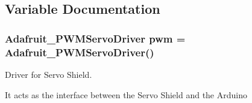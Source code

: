 \subsection{Variable Documentation}
\hypertarget{_final___demo___code_8ino_a2c06cc8f85429bb0f7cb91917164dc54}{
\subsubsection[{pwm}]{\setlength{\rightskip}{0pt plus 5cm}Adafruit\-\_\-\-P\-W\-M\-Servo\-Driver pwm = Adafruit\-\_\-\-P\-W\-M\-Servo\-Driver()}}\label{_final___demo___code_8ino_a2c06cc8f85429bb0f7cb91917164dc54}


Driver for Servo Shield. 

It acts as the interface between the Servo Shield and the Arduino 